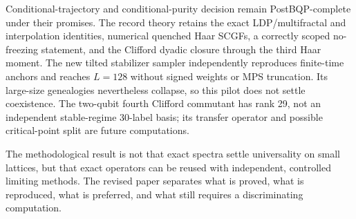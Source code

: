 Conditional-trajectory and conditional-purity decision remain PostBQP-complete under their promises. The record theory retains the exact LDP/multifractal and interpolation identities, numerical quenched Haar SCGFs, a correctly scoped no-freezing statement, and the Clifford dyadic closure through the third Haar moment. The new tilted stabilizer sampler independently reproduces finite-time anchors and reaches $L=128$ without signed weights or MPS truncation. Its large-size genealogies nevertheless collapse, so this pilot does not settle coexistence. The two-qubit fourth Clifford commutant has rank 29, not an independent stable-regime 30-label basis; its transfer operator and possible critical-point split are future computations.

The methodological result is not that exact spectra settle universality on small lattices, but that exact operators can be reused with independent, controlled limiting methods. The revised paper separates what is proved, what is reproduced, what is preferred, and what still requires a discriminating computation.
